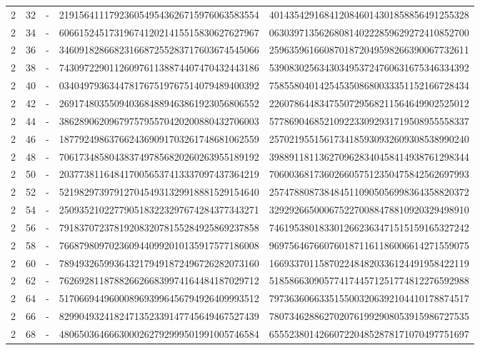\begin{longtable}{rrrll}
2 & 32 & - & 2191564111792360549543626715976063583554 & 4014354291684120846014301858856491255328 \\
2 & 34 & - & 6066152451731967412021415515830627627967 & 0630397135626808140222859629272410852700 \\
2 & 36 & - & 3460918286682316687255283717603674545066 & 2596359616608701872049598266390067732611 \\
2 & 38 & - & 7430972290112609761138874407470432443186 & 5390830256343034953724760631675346334392 \\
2 & 40 & - & 0340497936344781767519767514079489400392 & 7585580401425453508680033351152166728434 \\
2 & 42 & - & 2691748035509403684889463861923056806552 & 2260786448347550729568211564649902525012 \\
2 & 44 & - & 3862890620967975795570420200880432706003 & 5778690468521092233092931719508955558337 \\
2 & 46 & - & 1877924986376624369091703261748681062559 & 2570219551561734185930932609308538990240 \\
2 & 48 & - & 7061734858043837497856820260263955189192 & 3988911811362709628340458414938761298344 \\
2 & 50 & - & 2037738116484170056537413337097437364219 & 7060036817360266057512350475842562697993 \\
2 & 52 & - & 5219829739791270454931329918881529154640 & 2574788087384845110905056998364358820372 \\
2 & 54 & - & 2509352102277905183223297674284377343271 & 3292926650006752270088478810920329498910 \\
2 & 56 & - & 7918370723781920832078155284925869237858 & 7461953801833012662363471515159165327242 \\
2 & 58 & - & 7668798097023609440992010135917577186008 & 9697564676607601871161186006614271559075 \\
2 & 60 & - & 7894932659936432179491872496726282073160 & 1669337011587022484820336124491958422119 \\
2 & 62 & - & 7626928118788266266839974164484187029712 & 5185866309057741744571251774812276592988 \\
2 & 64 & - & 5170669449600089693996456794926409993512 & 7973636066335155003206392104410178874517 \\
2 & 66 & - & 8299049324182471352339147745649467527439 & 7807346288627020761992908053915986727535 \\
2 & 68 & - & 4806503646663000262792999501991005746584 & 6555238014266072204852878171070497751697 \\

\end{longtable}
